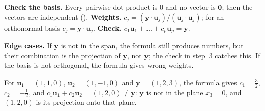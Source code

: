 \documentclass[10pt]{scrartcl}
\newcommand{\vv}[1]{\mathbf{#1}}
\newenvironment{howto}[1]{\begin{mdframed}[style=howtostyle,frametitle={#1}]}{\end{mdframed}}
\begin{document}
\begin{howto}{How to find coordinates in an orthogonal basis}
  \begin{steps}
    \ii \textbf{Check the basis.} Every pairwise dot product is $0$ and no vector is $\vv 0$; then the vectors are independent ().
    \ii \textbf{Weights.} $c_j=(\vv y\cdot\vv u_j)/(\vv u_j\cdot\vv u_j)$; for an orthonormal basis $c_j=\vv y\cdot\vv u_j$.
    \ii \textbf{Check.} $c_1\vv u_1+\dots+c_p\vv u_p=\vv y$.
  \end{steps}
  \textbf{Edge cases.} If $\vv y$ is not in the span, the formula still produces numbers, but their combination is the projection of $\vv y$, not $\vv y$; the check in step~3 catches this. If the basis is not orthogonal, the formula gives wrong weights.
\end{howto}

\begin{example*}
  For $\vv u_1=(1,1,0)$, $\vv u_2=(1,-1,0)$ and $\vv y=(1,2,3)$, the formula gives $c_1=\frac32$, $c_2=-\frac12$, and $c_1\vv u_1+c_2\vv u_2=(1,2,0)\neq\vv y$: $\vv y$ is not in the plane $x_3=0$, and $(1,2,0)$ is its projection onto that plane.
\end{example*}
\end{document}
